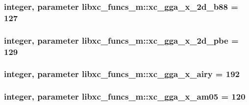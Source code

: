 \hypertarget{classlibxc__funcs__m_ae103757b8e60f5ad6b251dc26c856ade}{
\subsubsection[{xc\-\_\-gga\-\_\-x\-\_\-2d\-\_\-b88}]{\setlength{\rightskip}{0pt plus 5cm}integer, parameter libxc\-\_\-funcs\-\_\-m\-::xc\-\_\-gga\-\_\-x\-\_\-2d\-\_\-b88 = 127}}\label{classlibxc__funcs__m_ae103757b8e60f5ad6b251dc26c856ade}
\hypertarget{classlibxc__funcs__m_afc30c55391b0c919af0dbb60dae2c3d2}{
\subsubsection[{xc\-\_\-gga\-\_\-x\-\_\-2d\-\_\-pbe}]{\setlength{\rightskip}{0pt plus 5cm}integer, parameter libxc\-\_\-funcs\-\_\-m\-::xc\-\_\-gga\-\_\-x\-\_\-2d\-\_\-pbe = 129}}\label{classlibxc__funcs__m_afc30c55391b0c919af0dbb60dae2c3d2}
\hypertarget{classlibxc__funcs__m_a176badabd1f8c45f5532a356eff0af3f}{
\subsubsection[{xc\-\_\-gga\-\_\-x\-\_\-airy}]{\setlength{\rightskip}{0pt plus 5cm}integer, parameter libxc\-\_\-funcs\-\_\-m\-::xc\-\_\-gga\-\_\-x\-\_\-airy = 192}}\label{classlibxc__funcs__m_a176badabd1f8c45f5532a356eff0af3f}
\hypertarget{classlibxc__funcs__m_a761deead1a0f8566c2b5edd476020c95}{
\subsubsection[{xc\-\_\-gga\-\_\-x\-\_\-am05}]{\setlength{\rightskip}{0pt plus 5cm}integer, parameter libxc\-\_\-funcs\-\_\-m\-::xc\-\_\-gga\-\_\-x\-\_\-am05 = 120}}\label{classlibxc__funcs__m_a761deead1a0f8566c2b5edd476020c95}
